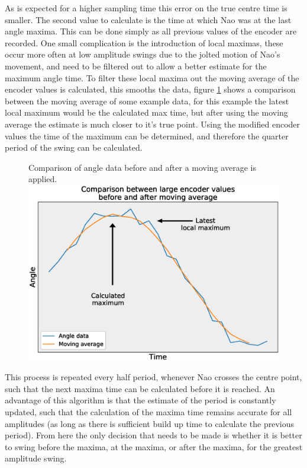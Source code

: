 \documentclass[11pt]{article}
\begin{document}
As is expected for a higher sampling time this error on the true centre time is smaller. The second value to calculate is the time at which Nao was at the last angle maxima. This can be done simply as all previous values of the encoder are recorded. One small complication is the introduction of local maximas, these occur more often at low amplitude swings due to the jolted motion of Nao's movement, and need to be filtered out to allow a better estimate for the maximum angle time. To filter these local maxima out the moving average of the encoder values is calculated, this smooths the data, figure \ref{fig:MovingAverageDiagram} shows a comparison between the moving average of some example data, for this example the latest local maximum would be the calculated max time, but after using the moving average the estimate is much closer to it's true point. Using the modified encoder values the time of the maximum can be determined, and therefore the quarter period of the swing can be calculated. \\

    \begin{figure}[!htb]
        \centering
        \captionbox
             {Comparison of angle data before and after a moving average is applied.\label{fig:MovingAverageDiagram}}
             {\includegraphics[width=1.0\textwidth]{MovingAverageDiagram.eps}}
    \end{figure}


This process is repeated every half period, whenever Nao crosses the centre point, such that the next maxima time can be calculated before it is reached. An advantage of this algorithm is that the estimate of the period is constantly updated, such that the calculation of the maxima time remains accurate for all amplitudes (as long as there is sufficient build up time to calculate the previous period). From here the only decision that needs to be made is whether it is better to swing before the maxima, at the maxima, or after the maxima, for the greatest amplitude swing.
\end{document}
